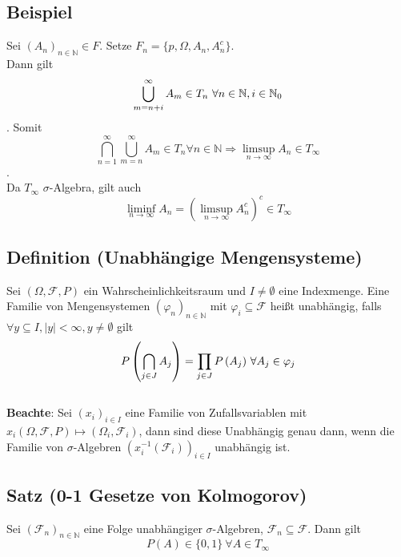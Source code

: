 \documentclass[german,10pt,oneside, fleqn, a4paper]{article}
\newcommand {\N}	{\mathbb{N}}
\newcommand{\brc}[1]{\left(#1\right)}
\newcommand{\mc}[1]{\mathcal{#1}}
\newcommand{\1}[1]{1_{#1}}
\newcommand{\2}[1]{\1{\brac{#1}}}
\newcommand{\raum}{\brc{\Omega,\mc{F},P}}
\newcommand{\f}{\mc{F}}
\begin{document}
\subsection{Beispiel}
Sei $(A_n)_{n\in\N}\in F$. Setze $F_n=\lbrace p,\Omega,A_n,A_n^c\rbrace.$\\
Dann gilt \[\bigcup\limits_{m=n+i}^\infty A_m\in T_n$ $\forall n\in\N, i\in\N_0\].
Somit \[\bigcap\limits_{n=1}^\infty\bigcup\limits_{m=n}^\infty A_m \in T_n \forall n \in \N \Rightarrow\limsup\limits_{n\rightarrow\infty}A_n\in T_\infty\].\\
Da $T_\infty$ $\sigma$-Algebra, gilt auch\\
\[\liminf\limits_{n\rightarrow\infty}A_n=\left(\limsup\limits_{n\rightarrow\infty}A_n^c\right)^c\in T_\infty\]

\subsection{Definition (Unabhängige Mengensysteme)}
Sei $\raum$ ein Wahrscheinlichkeitsraum und $I\neq\emptyset$ eine Indexmenge. Eine Familie von Mengensystemen $\left(\varphi_n\right)_{n\in\N}$ mit $\varphi_i \subseteq\f$  heißt unabhängig, falls $\forall y\subseteq I, \vert y \vert < \infty, y\neq\emptyset$ gilt \\
\[P\left(\bigcap\limits_{j\in J}A_j\right)=\prod\limits_{j\in J}P\left(A_j\right)$ $\forall A_j \in\varphi_j\]\\
 \textbf{Beachte}: Sei $\left( x_i \right)_{i\in I}$ eine Familie von Zufallsvariablen mit $x_i\raum\mapsto\left(\Omega_i,\f_i \right)$, dann sind diese Unabhängig genau dann, wenn die Familie von $\sigma$-Algebren $\left(x_i^{-1}\left(\f_i\right)\right)_{i\in I}$ unabhängig ist.

\subsection{Satz (0-1 Gesetze von Kolmogorov)}
Sei $\left(\f_n\right)_{n\in\N}$ eine Folge unabhängiger $\sigma$-Algebren, $\f_n\subseteq\f$. Dann gilt\\
\[P\left(A\right)\in \lbrace 0,1\rbrace\ \forall A \in T_\infty\] \\
\end{document}
